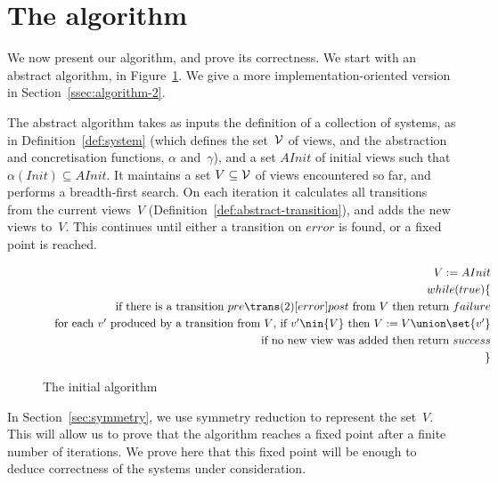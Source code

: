 \section{The algorithm}
\label{sec:algorithm}

We now present our algorithm, and prove its correctness.  We start with an
abstract algorithm, in Figure~\ref{fig:algorithm}.  We give a more
implementation-oriented version in Section~\ref{ssec:algorithm-2}.

The abstract algorithm takes as inputs the definition of a collection of
systems, as in Definition~\ref{def:system} (which defines the set~$\mathcal{V}$ of
views, and the abstraction and concretisation functions, $\alpha$
and~$\gamma$), and a set $AInit$ of initial views such that $\alpha(Init)
\subseteq {AInit}$.  It maintains a set $V \subseteq \mathcal{V}$ of views encountered
so far, and performs a breadth-first search.  On each iteration it calculates
all transitions from the current views~$V$
(Definition~\ref{def:abstract-transition}), and adds the new views to~$V$.
This continues until either a transition on $error$ is found, or a fixed point
is reached.

\begin{figure}[t]
\[
\begin{align}
V := AInit \\
while(true)\{ \\
\quad \mbox{if there is a transition $pre \trans(2)[error] post$
  from~${V}$ then return $failure$} \\
\quad \mbox{for each $v'$ produced by a transition from $V$, 
  if $v' \nin {V}$ then 
  $V := V \union \set{v'}$} \\
\quad \mbox{if no new view was added then return $success$} \\ 
\}
\end{align}
\]
\caption{The initial algorithm}
\label{fig:algorithm}
\end{figure}


In Section~\ref{sec:symmetry}, we use symmetry reduction to represent the
set~$V$.  This will allow us to prove that the algorithm reaches a fixed point
after a finite number of iterations.  We prove here that this fixed point will
be enough to deduce correctness of the systems under consideration. 


